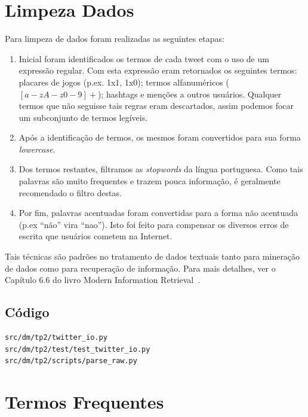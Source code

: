 \documentclass[brazil,a4paper,12pt]{article}
\begin{document}
\section{Limpeza Dados}

Para limpeza de dados foram realizadas as seguintes etapas:

\begin{enumerate}
\item Inicial foram identificados os termos de cada tweet com o uso 
de um expressão regular. Com esta expressão eram 
retornados os seguintes termos: placares de jogos (p.ex. 1x1, 1x0);
termos alfanuméricos ($[a-zA-z0-9]+$); hashtags e menções a outros
usuários. Qualquer termos que não seguisse tais regras eram descartados,
assim podemos focar um subconjunto de termos legíveis.

\item Após a identificação de termos, os mesmos foram convertidos para
sua forma {\it lowercase}.

\item Dos termos restantes, filtramos as {\it stopwords} da língua
portuguesa. Como tais palavras são muito frequentes e trazem pouca
informação, é geralmente recomendado o filtro destas.

\item Por fim, palavras acentuadas foram convertidas para a forma
não acentuada (p.ex ``não'' vira ``nao''). Isto foi feito para
compensar os diversos erros de escrita que usuários cometem na 
Internet.

\end{enumerate}

\noindent Tais técnicas são padrões no tratamento de dados textuais 
tanto para mineração de dados como para recuperação de informação.
Para mais detalhes, ver o Capítulo 6.6 do livro Modern Information Retrieval~\cite{baeza2010modern}.

\subsection{Código}

\begin{verbatim}
src/dm/tp2/twitter_io.py
src/dm/tp2/test/test_twitter_io.py
src/dm/tp2/scripts/parse_raw.py
\end{verbatim}

\section{Termos Frequentes}
\end{document}
